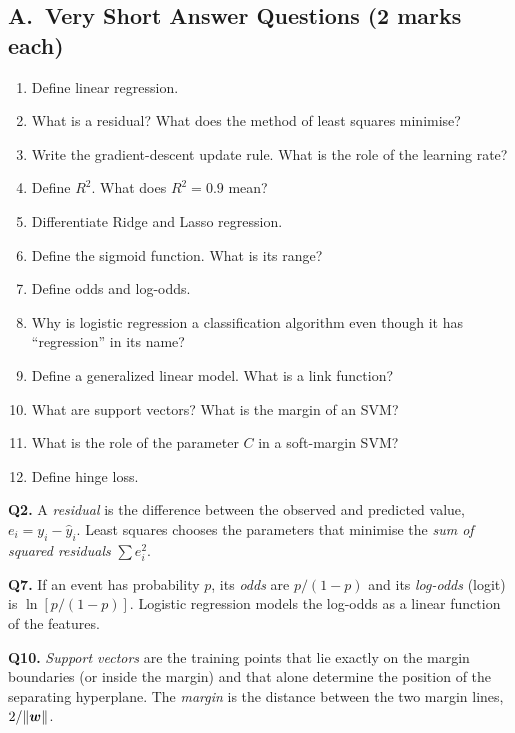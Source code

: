 \subsection*{A.\ Very Short Answer Questions (2 marks each)}
\begin{enumerate}
  \item Define linear regression. 
  \item What is a residual? What does the method of least squares minimise? 
  \item Write the gradient-descent update rule. What is the role of the learning rate? 
  \item Define $R^2$. What does $R^2=0.9$ mean? 
  \item Differentiate Ridge and Lasso regression. 
  \item Define the sigmoid function. What is its range? 
  \item Define odds and log-odds. 
  \item Why is logistic regression a classification algorithm even though it has ``regression'' in its name? 
  \item Define a generalized linear model. What is a link function? 
  \item What are support vectors? What is the margin of an SVM? 
  \item What is the role of the parameter $C$ in a soft-margin SVM? 
  \item Define hinge loss. 
\end{enumerate}

\begin{modelans}[: Q2, Q7 and Q10]
\textbf{Q2.} A \emph{residual} is the difference between the observed and predicted value, $e_i=y_i-\hat y_i$. Least squares chooses the parameters that minimise the \emph{sum of squared residuals} $\sum e_i^2$.\par
\textbf{Q7.} If an event has probability $p$, its \emph{odds} are $p/(1-p)$ and its \emph{log-odds} (logit) is $\ln[p/(1-p)]$. Logistic regression models the log-odds as a linear function of the features.\par
\textbf{Q10.} \emph{Support vectors} are the training points that lie exactly on the margin boundaries (or inside the margin) and that alone determine the position of the separating hyperplane. The \emph{margin} is the distance between the two margin lines, $2/\|\boldsymbol{w}\|$.
\end{modelans}

